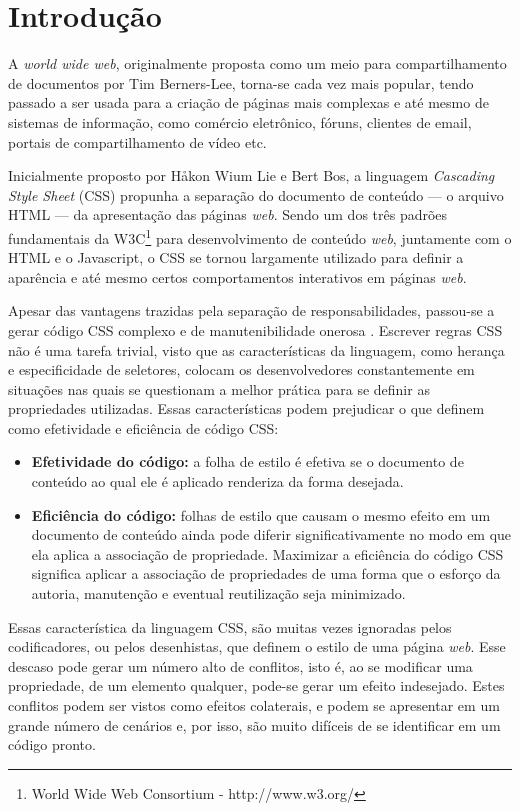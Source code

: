 \chapter{Introdução}
\label{chap:Intr}
A \textit{world wide web}, originalmente proposta como um meio para compartilhamento de documentos por Tim Berners-Lee, torna-se cada vez mais popular, tendo passado a ser usada para a criação de páginas mais complexas e até mesmo de sistemas de informação, como comércio eletrônico, fóruns, clientes de email, portais de compartilhamento de vídeo etc.

Inicialmente proposto por Håkon Wium Lie e Bert Bos, a linguagem \textit{Cascading Style Sheet} (CSS) propunha a separação do documento de conteúdo --- o arquivo HTML --- da apresentação das páginas \textit{web}. Sendo um dos três padrões fundamentais da W3C\footnote{World Wide Web Consortium - http://www.w3.org/} para desenvolvimento de conteúdo \textit{web}, juntamente com o HTML e o Javascript, o CSS se tornou largamente utilizado para definir a aparência e até mesmo certos comportamentos interativos em páginas \textit{web}. 

Apesar das vantagens trazidas pela separação de responsabilidades, passou-se a gerar código CSS complexo e de manutenibilidade onerosa \cite{Mesbah2012}. Escrever regras CSS não é uma tarefa trivial, visto que as características da linguagem, como herança e especificidade de seletores, colocam os desenvolvedores constantemente em situações nas quais se questionam a melhor prática para se definir as propriedades utilizadas. Essas características podem prejudicar o que  definem como efetividade e eficiência de código CSS:
\begin{itemize}
	\item\textbf{Efetividade do código:} a folha de estilo é efetiva se o documento de conteúdo ao qual ele é aplicado renderiza da forma desejada.
	
	\item\textbf{Eficiência do código:} folhas de estilo que causam o mesmo efeito em um documento de conteúdo ainda pode diferir significativamente no modo em que ela aplica a associação de propriedade. Maximizar a eficiência do código CSS significa aplicar a associação de propriedades de uma forma que o esforço da autoria, manutenção e eventual reutilização seja minimizado.
\end{itemize}

Essas característica da linguagem CSS, são muitas vezes ignoradas pelos codificadores, ou pelos desenhistas, que definem o estilo de uma página \textit{web}. Esse descaso pode gerar um número alto de conflitos, isto é, ao se modificar uma propriedade, de um elemento qualquer, pode-se gerar um efeito indesejado. Estes conflitos podem ser vistos como efeitos colaterais, e podem se apresentar em um grande número de cenários e, por isso, são muito difíceis de se identificar em um código pronto.

